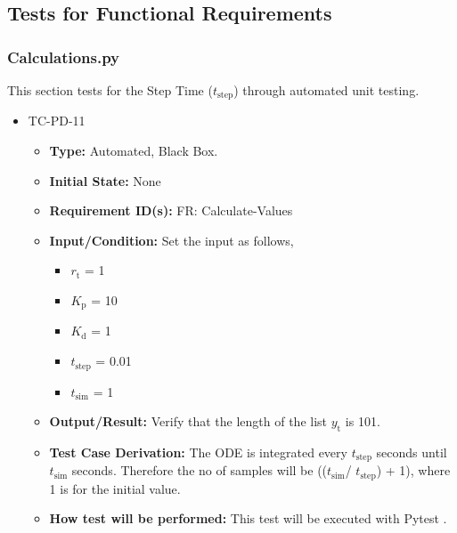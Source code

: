 \documentclass[12pt, titlepage]{article}
\begin{document}
\subsection{Tests for Functional Requirements}


\subsubsection{Calculations.py}


This section tests for the Step Time (${t_{\text{step}}}$) through automated unit testing.

\begin{itemize}
\item{TC-PD-11\\}
\begin{itemize}

\item{\textbf{Type:}}  Automated, Black Box.
					
\item{\textbf{Initial State:}} None

\item{\textbf{Requirement ID(s):}}  FR: Calculate-Values
					
\item{\textbf{Input/Condition:}}  Set the input as follows,

\begin{itemize}
\item ${r_{\text{t}}}$ = 1
\item ${K_{\text{p}}}$ = 10
\item ${K_{\text{d}}}$ = 1
\item ${t_{\text{step}}}$ = 0.01
\item ${t_{\text{sim}}}$ = 1 
\end{itemize}

\item{\textbf{Output/Result:}} Verify that the length of the list ${y_{\text{t}}}$ is 101.

\item{\textbf{Test Case Derivation:}} The ODE is integrated every  ${t_{\text{step}}}$ seconds 
until  ${t_{\text{sim}}}$ seconds. Therefore the no of samples will be  
((${t_{\text{sim}}}$/ ${t_{\text{step}}}$) + 1), where 1 is for the initial value.

\item{\textbf{How test will be performed:}}  This test will be executed with Pytest \cite{Pytest}.

\end{itemize}
\end{itemize}
\end{document}
